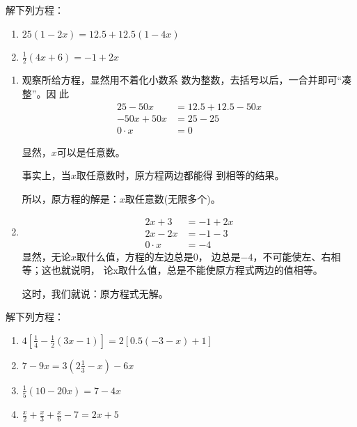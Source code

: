 \begin{example}
解下列方程：
\begin{enumerate}
    \item $25(1-2x)=12.5+12.5(1-4x)$
    \item $\frac{1}{2}(4x+6)=-1+2x$
\end{enumerate}
\end{example}

\begin{solution}
\begin{enumerate}
    \item     观察所给方程，显然用不着化小数系
    数为整数，去括号以后，一合并即可“凑整”。因
    此
    \begin{align*}
25-50x&=12.5+12.5-50x  \tag{去括号}\\
    -50x+50x&=25-25  \tag{移项}\\
    0\cdot x&=0 \tag{合并同类项}    
    \end{align*}
    
    显然，$x$可以是任意数。

    事实上，当$x$取任意数时，原方程两边都能得
到相等的结果。

    所以，原方程的解是：$x$取任意数(无限多个)。
    
\item     \begin{align*}
    2x+3&=-1+2x  \tag{去括号}\\
        2x-2x&=-1-3  \tag{移项}\\
        0\cdot x&=-4 \tag{合并同类项}    
        \end{align*}
        显然，无论$x$取什么值，方程的左边总是0，
    边总是$-4$，不可能使左、右相等；这也就说明，
    论x取什么值，总是不能使原方程式两边的值相等。

        这时，我们就说：原方程式无解。
\end{enumerate}    
\end{solution}

\begin{ex}
解下列方程：
\begin{enumerate}
    \item $4\left[\frac{1}{4}-\frac{1}{2}(3x-1)\right]=2[0.5(-3-x)+1]$
    \item $7-9x=3\left(2\frac{1}{3}-x\right)-6x$
    \item $\frac{1}{5}(10-20x)=7-4x$
    \item $\frac{x}{2}+\frac{x}{3}+\frac{x}{6}-7=2x+5$
\end{enumerate}
\end{ex}


